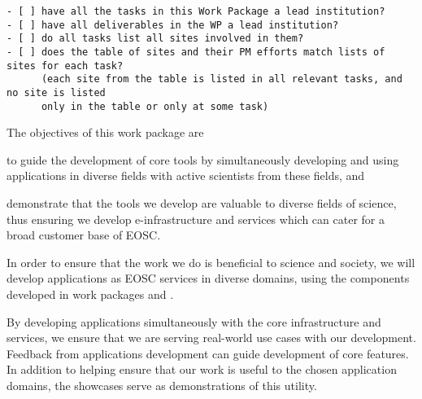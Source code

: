 \begin{draft}
\begin{verbatim}
- [ ] have all the tasks in this Work Package a lead institution?
- [ ] have all deliverables in the WP a lead institution?
- [ ] do all tasks list all sites involved in them?
- [ ] does the table of sites and their PM efforts match lists of sites for each task?
      (each site from the table is listed in all relevant tasks, and no site is listed
      only in the table or only at some task)
\end{verbatim}
\end{draft}

\begin{workpackage}[id=applications,wphases=0-48,swsites,
  title=Science demonstrators,
  short=Demonstrators,
  lead=XFEL,
  EGIRM=7,
  CDSRM=12,
  INSERMRM=24,
  QSRM=6,
  SILRM=12,
  SRLRM=9,
  UIORM=12,
  UPSUDRM=20,
  WTTRM=3,
  XFELRM=36,
  EPRM=3,
]
\begin{wpobjectives}
  The objectives of this work package are
 \begin{compactitem}
   \item to guide the development of core tools by simultaneously
     developing and using applications in diverse fields with active
     scientists from these fields, and
   \item demonstrate that the tools we develop are valuable to diverse
     fields of science, thus ensuring we develop e-infrastructure and
     services which can cater for a broad customer base of EOSC.
 \end{compactitem}
\end{wpobjectives}

\begin{wpdescription}

  In order to ensure that the work we do is beneficial to science and
  society, we will develop applications as EOSC services in diverse domains, using the
  components developed in work packages  and
  .

  By developing applications simultaneously with the core
  infrastructure and services, we ensure that we are serving
  real-world use cases with our development.  Feedback from
  applications development can guide development of core features.  In
  addition to helping ensure that our work is useful to the chosen
  application domains, the showcases serve as demonstrations of
  this utility.


\end{wpdescription}
\end{workpackage}
